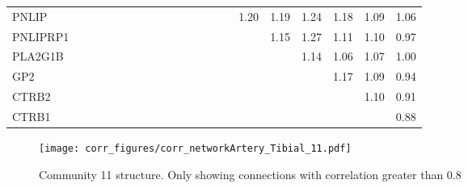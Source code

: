 \begin{longtable}{lrrrrrrrrrrrrrrrrrrrr}
PNLIP    &              &              &              &             &             &             &             &            &            &            &            &             &           &             &           1.20 &          1.19 &      1.24 &        1.18 &        1.09 &       1.06 \\
PNLIPRP1 &              &              &              &             &             &             &             &            &            &            &            &             &           &             &                &          1.15 &      1.27 &        1.11 &        1.10 &       0.97 \\
PLA2G1B  &              &              &              &             &             &             &             &            &            &            &            &             &           &             &                &               &      1.14 &        1.06 &        1.07 &       1.00 \\
GP2      &              &              &              &             &             &             &             &            &            &            &            &             &           &             &                &               &           &        1.17 &        1.09 &       0.94 \\
CTRB2    &              &              &              &             &             &             &             &            &            &            &            &             &           &             &                &               &           &             &        1.10 &       0.91 \\
CTRB1    &              &              &              &             &             &             &             &            &            &            &            &             &           &             &                &               &           &             &             &       0.88 \\
\end{longtable}


\begin{figure}[h!]
\centering
\texttt{[image: corr\_figures/corr\_networkArtery\_Tibial\_11.pdf]}
\caption{Community 11 structure. Only showing connections with correlation greater than 0.8}
\end{figure}




